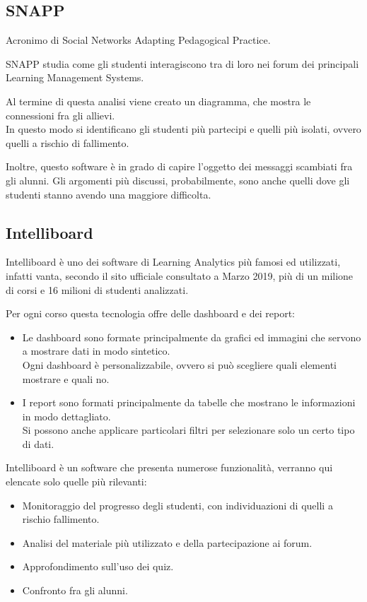 \subsection{SNAPP}

Acronimo di Social Networks Adapting Pedagogical Practice.

SNAPP \cite{Snapp} studia come gli studenti interagiscono tra di loro nei forum dei principali Learning Management Systems.

Al termine di questa analisi viene creato un diagramma, che mostra le connessioni fra gli allievi. \\ In questo modo si identificano gli studenti più partecipi e quelli più isolati, ovvero quelli a rischio di fallimento.

Inoltre, questo software è in grado di capire l'oggetto dei messaggi scambiati fra gli alunni. Gli argomenti più discussi, probabilmente, sono anche quelli dove gli studenti stanno avendo una maggiore difficolta.

\subsection{Intelliboard}

Intelliboard è uno dei software di Learning Analytics più famosi ed utilizzati, infatti vanta, secondo il sito ufficiale consultato a Marzo 2019, più di un milione di corsi e 16 milioni di studenti analizzati.

Per ogni corso questa tecnologia offre delle dashboard e dei report: 

\begin{itemize}
\item Le dashboard sono formate principalmente da grafici ed immagini che servono a mostrare dati in modo sintetico. \\ Ogni dashboard è personalizzabile, ovvero si può scegliere quali elementi mostrare e quali no.
\item I report sono formati principalmente da tabelle che mostrano le informazioni in modo dettagliato. \\ Si possono anche applicare particolari filtri per selezionare solo un certo tipo di dati.
\end{itemize}

Intelliboard è un software che presenta numerose funzionalità, verranno qui elencate solo quelle più rilevanti:

\begin{itemize}

\item Monitoraggio del progresso degli studenti, con individuazioni di quelli a rischio fallimento.
\item Analisi del materiale più utilizzato e della partecipazione ai forum.
\item Approfondimento sull'uso dei quiz.
\item Confronto fra gli alunni.

\end{itemize}


